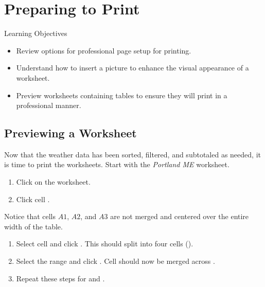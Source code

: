 \section{Preparing to Print}

\begin{center}
	\begin{objbox}{Learning Objectives}
		\begin{itemize}
			\setlength{\itemsep}{0pt}
			\setlength{\parskip}{0pt}
			\setlength{\parsep}{0pt}

			\item Review options for professional page setup for printing.
			\item Understand how to insert a picture to enhance the visual appearance of a worksheet.
			\item Preview worksheets containing tables to ensure they will print in a professional manner.
			
		\end{itemize}
	\end{objbox}
\end{center}

\subsection{Previewing a Worksheet}

Now that the weather data has been sorted, filtered, and subtotaled as needed, it is time to print the worksheets. Start with the \textit{Portland ME} worksheet.

\begin{enumerate}
	\item Click on the  worksheet. 
	\item Click cell .
\end{enumerate}

Notice that cells $ A1 $, $ A2 $, and $ A3 $ are not merged and centered over the entire width of the table. 

\begin{enumerate}
	\item Select cell  and click . This should split  into four cells ().
	\item Select the range  and click . Cell  should now be merged across .
	\item Repeat these steps for  and .
\end{enumerate}

